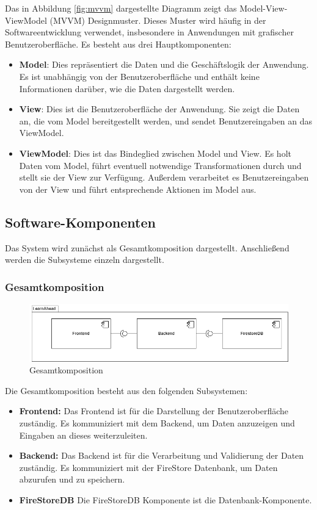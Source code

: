 \noindent
Das in Abbildung \ref{fig:mvvm} dargestellte Diagramm zeigt das Model-View-ViewModel (MVVM) Designmuster. Dieses Muster wird häufig in der Softwareentwicklung verwendet, insbesondere in Anwendungen mit grafischer Benutzeroberfläche. Es besteht aus drei Hauptkomponenten:

\begin{itemize}
\item \textbf{Model}: Dies repräsentiert die Daten und die Geschäftslogik der Anwendung. Es ist unabhängig von der Benutzeroberfläche und enthält keine Informationen darüber, wie die Daten dargestellt werden.
\item \textbf{View}: Dies ist die Benutzeroberfläche der Anwendung. Sie zeigt die Daten an, die vom Model bereitgestellt werden, und sendet Benutzereingaben an das ViewModel.
\item \textbf{ViewModel}: Dies ist das Bindeglied zwischen Model und View. Es holt Daten vom Model, führt eventuell notwendige Transformationen durch und stellt sie der View zur Verfügung. Außerdem verarbeitet es Benutzereingaben von der View und führt entsprechende Aktionen im Model aus.
\end{itemize}
\subsection{Software-Komponenten}
Das System wird zunächst als Gesamtkomposition dargestellt. Anschließend werden die Subsysteme einzeln dargestellt. 
\subsubsection{Gesamtkomposition}
\begin{figure}[H]
    \centering
    \includegraphics[width=1\textwidth]{images/diagramme/Gesamtkomposition.png}
    \caption{Gesamtkomposition}
    \label{fig:Gesamtkomposition}
\end{figure}
\noindent
Die Gesamtkomposition besteht aus den folgenden Subsystemen:
\begin{itemize}
    \item \textbf{Frontend:} Das Frontend ist für die Darstellung der Benutzeroberfläche zuständig. Es kommuniziert mit dem Backend, um Daten anzuzeigen und Eingaben an dieses weiterzuleiten.
    \item \textbf{Backend:} Das Backend ist für die Verarbeitung und Validierung der Daten zuständig. Es kommuniziert mit der FireStore Datenbank, um Daten abzurufen und zu speichern.
    \item \textbf{FireStoreDB} Die FireStoreDB Komponente ist die Datenbank-Komponente.
\end{itemize}

